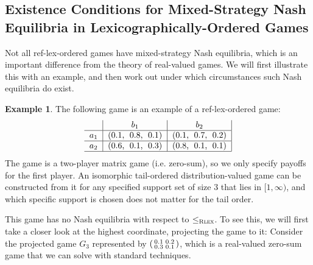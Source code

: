 \documentclass[a4paper,DIV=11,abstracton,twoside=semi]{scrreprt}
\theoremstyle{definition}
\newtheorem{ex}[thm]{Example} %
\begin{document}
    \subsection[Existence Conditions for Mixed-Strategy Nash Equilibria in\\ Lexicographically-Ordered Games]{Existence Conditions for Mixed-Strategy Nash Equilibria in Lexicographically-Ordered Games}
    Not all ref-lex-ordered games have mixed-strategy Nash equilibria, which is an important difference from the theory of real-valued games. We will first illustrate this with an example, and then work out under which circumstances such Nash equilibria do exist.
    
    \newcommand{\Gproj}[1]{G_{#1}}
    \newcommand{\Gprojsub}[1]{\bar{G}_{#1}}
    
    \begin{ex}
        \label{ex:reflectedLexicographicallyOrderedGameWithoutEquilibria}
        The following game is an example of a ref-lex-ordered game:
        \begin{gather}
            \centering
            \begin{tabular}{c|c|c|}
            	      &        $b_1$        &        $b_2$        \\ \hline
            	$a_1$ & (0.1,\; 0.8,\; 0.1) & (0.1,\; 0.7,\; 0.2) \\ \hline
            	$a_2$ & (0.6,\; 0.1,\; 0.3) & (0.8,\; 0.1,\; 0.1) \\ \hline
            \end{tabular}
        \end{gather}
        The game is a two-player matrix game (i.e. zero-sum), so we only specify payoffs for the first player.
        An isomorphic tail-ordered distribution-valued game can be constructed from it for any specified support set of size 3 that lies in $[1, \infty)$,
        and which specific support is chosen does not matter for the tail order.
        
        This game has no Nash equilibria with respect to $\leq_{\textsc{Rlex}}$.
        To see this, we will first take a closer look at the highest coordinate, projecting the game to it: Consider the projected game
        $\Gproj{3}$ represented by $\left(\begin{smallmatrix}0.1 & 0.2 \\ 0.3 & 0.1\end{smallmatrix}\right)$, which is a real-valued zero-sum game that we can solve with standard techniques.
        

\end{ex}
\end{document}
